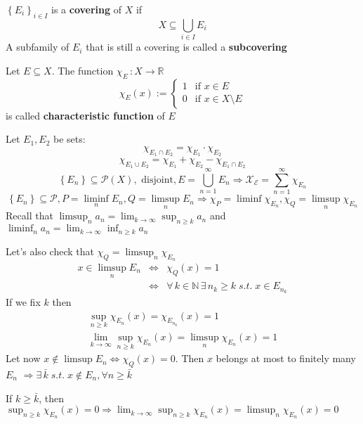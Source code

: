 \begin{definition}
    \(\left\lbrace E_i \right\rbrace_{i \in I}\) is a \textbf{covering} of \(X\) if 
    \[
        X \subseteq \bigcup_{i \in I} E_i
    \]
A subfamily of \(E_i\) that is still a covering is called a \textbf{subcovering}
\end{definition}
\begin{definition}
    Let \(E \subseteq X\). The function \(\chi_E \, : X \rightarrow \mathbb{R}\) 
    \[
        \chi_E (x):= \begin{cases}
            1 & \mbox{if } x \in E \\
            0 & \mbox{if } x \in X\setminus E
        \end{cases}
    \]
    is called \textbf{characteristic function} of \(E\)
\end{definition}
Let \(E_1, E_2\) be sets:
\[
    \chi_{E_1 \cap E_2} = \chi_{E_1} \cdot \chi_{E_2}
\]
\[
    \chi_{E_1 \cup E_2} = \chi_{E_1} + \chi_{E_2} - \chi_{E_1 \cap E_2} 
\]
\[
    \left\lbrace E_n \right\rbrace \subseteq \mathcal{P}(X), \mbox{ disjoint}, E = \bigcup_{n = 1}^{\infty} E_n \Rightarrow \mathcal{X_E} = \sum_{n = 1}^{\infty} \chi_{E_n}
\]
\[
    \left\lbrace E_n \right\rbrace \subseteq \mathcal{P}, P = \liminf_n E_n, Q = \limsup_n E_n \Rightarrow \chi_P = \liminf \chi_{E_n}, \chi_Q = \limsup_n \chi_{E_n}
\]
Recall that \(\limsup_n a_n = \lim_{k \to \infty} \sup_{n \geq k} a_n\) and \(\liminf_n a_n = \lim_{k \to \infty} \inf_{n \geq k} a_n\)


Let's also check that \(\chi_Q = \limsup_n \chi_{E_n}\)
\[
    \begin{array}{ccl}   
    x \in \limsup_n E_n & \Leftrightarrow & \chi_Q(x) = 1 \\
    & \Leftrightarrow & \forall \, k \in \mathbb{N} \, \exists \, n_k \geq k \; s.t. \; x \in E_{n_k}
    \end{array}
    \]
If we fix \(k\) then 
\[
    \begin{array}{c}
        \sup_{n \geq k} \chi_{E_n}(x) = \chi_{E_{n_k}}(x) = 1 \\
        \lim_{k \to \infty} \sup_{n \geq k} \chi_{E_n}(x) = \limsup_n \chi_{E_n}(x) = 1
    \end{array}
\]
    Let now \(x \not \in \limsup E_n \Leftrightarrow \chi_Q(x) = 0\).
    Then \(x\) belongs at most to finitely many \(E_n\) \(\Rightarrow \exists \, \bar{k}\; s.t. \; x \not \in E_n, \forall n \geq \bar{k}\)
    
    If \(k \geq \bar{k}\), then \(\sup_{n \geq k} \chi_{E_n} (x) = 0 \Rightarrow \lim_{k \to \infty} \sup_{n \geq k} \chi_{E_n}(x) = \limsup_n \chi_{E_n} (x) = 0\)

